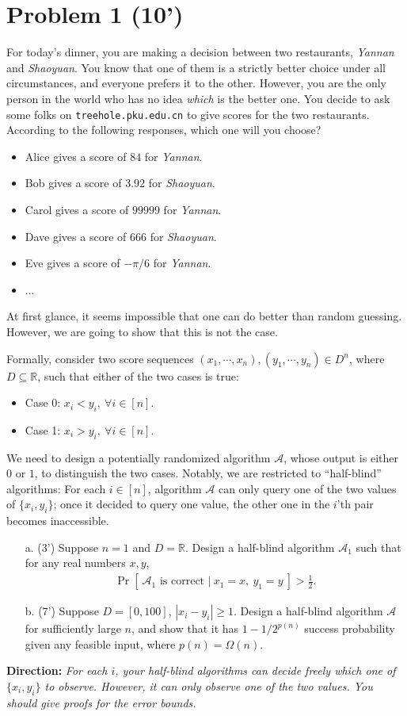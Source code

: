    
\section*{Problem 1 (10')}
For today's dinner, you are making a decision between two restaurants, \textit{Yannan} and \textit{Shaoyuan}. You know that one of them is a strictly better choice under all circumstances, and everyone prefers it to the other. However, you are the only person in the world who has no idea \textit{which} is the better one. You decide to ask some folks on \texttt{treehole.pku.edu.cn} to give scores for the two restaurants. According to the following responses, which one will you choose?
\begin{itemize}
    \item Alice gives a score of $84$ for \textit{Yannan}.
    \item Bob gives a score of $3.92$ for \textit{Shaoyuan}.
    \item Carol gives a score of $99999$ for \textit{Yannan}.
    \item Dave gives a score of $666$ for \textit{Shaoyuan}.
    \item Eve gives a score of $-\pi/6$ for \textit{Yannan}.
    \item ...
\end{itemize}
At first glance, it seems impossible that one can do better than random guessing. However, we are going to show that this is not the case. 

Formally, consider two score sequences $(x_1, \cdots, x_n), (y_1, \cdots, y_n) \in D^n$, where $D \subseteq \mathbb{R}$, such that either of the two cases is true:
\begin{itemize}
    \item Case 0: $x_i < y_i, \ \forall i\in [n]$. 
    \item Case 1: $x_i > y_i, \ \forall i\in [n]$. 
\end{itemize}
We need to design a potentially randomized algorithm $\mathcal{A}$, whose output is either $0$ or $1$, to distinguish the two cases. Notably, we are restricted to ``half-blind'' algorithms: For each $i\in [n]$, algorithm $\mathcal{A}$ can only query one of the two values of $\{x_i,y_i\}$; once it decided to query one value, the other one in the $i$'th pair becomes inaccessible. 

\begin{itemize}
    \item [a.] (3') Suppose $n=1$ and $D = \mathbb{R}$. Design a half-blind algorithm $\mathcal{A}_1$ such that for any real numbers $x, y$,
    \begin{align*}
    \Pr\left[\ \mathcal{A}_1\text{ is correct } | \ x_1 = x, \  y_1 = y \ \right] > \frac{1}{2}.
    \end{align*}
    \item [b.] (7') Suppose $D = [0,100]$, $|x_i -y_i| \geq 1$. Design a half-blind algorithm $\mathcal{A}$ for sufficiently large $n$, and show that it has $1-1/2^{p(n)}$ success probability given any feasible input, where $p(n) = \Omega(n)$.
\end{itemize}

\textbf{Direction:} \textit{For each $i$, your half-blind algorithms can decide freely which one of $\{x_i, y_i\}$ to observe. However, it can only observe one of the two values. You should give proofs for the error bounds.}